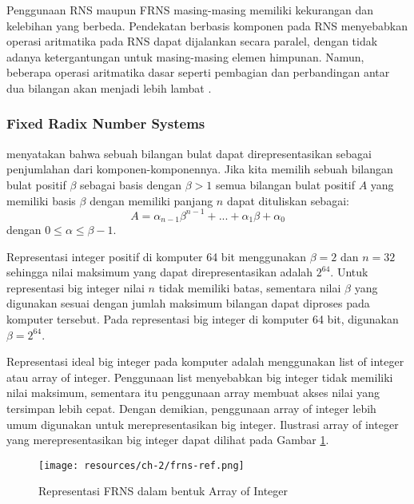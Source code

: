     Penggunaan RNS maupun FRNS masing-masing memiliki kekurangan dan kelebihan yang berbeda. Pendekatan berbasis komponen pada RNS menyebabkan operasi aritmatika pada RNS dapat dijalankan secara paralel, dengan tidak adanya ketergantungan untuk masing-masing elemen himpunan. Namun, beberapa operasi aritmatika dasar seperti pembagian dan perbandingan antar dua bilangan akan menjadi lebih lambat \citep{gpu_bignum}.

    \subsubsection{Fixed Radix Number Systems} \label{sec:frns}

    \citet{modern_comp_math} menyatakan bahwa sebuah bilangan bulat dapat direpresentasikan sebagai penjumlahan dari komponen-komponennya. Jika kita memilih sebuah bilangan bulat positif $\beta$ sebagai basis dengan $\beta > 1 $ semua bilangan bulat positif $A$ yang memiliki basis $\beta$ dengan memiliki panjang $n$ dapat dituliskan sebagai:
    \begin{equation} \label{eq:frns_rep}
      A = \alpha_{n-1}\beta^{n-1}+...+\alpha_{1}\beta+\alpha_{0}
    \end{equation}
    dengan $0 \leq \alpha \leq \beta -1$.

    Representasi integer positif di komputer 64 bit menggunakan $\beta = 2$ dan $n = 32$ sehingga nilai maksimum yang dapat direpresentasikan adalah $2^{64}$. Untuk representasi big integer nilai $n$ tidak memiliki batas, sementara nilai $\beta$ yang digunakan sesuai dengan jumlah maksimum bilangan dapat diproses pada komputer tersebut. Pada representasi big integer di komputer 64 bit, digunakan $\beta = 2^{64}$.

    Representasi ideal big integer pada komputer adalah menggunakan list of integer atau array of integer. Penggunaan list menyebabkan big integer tidak memiliki nilai maksimum, sementara itu penggunaan array membuat akses nilai yang tersimpan lebih cepat. Dengan demikian, penggunaan array of integer lebih umum digunakan untuk merepresentasikan big integer. Ilustrasi array of integer yang merepresentasikan big integer dapat dilihat pada Gambar \ref{fig:frns_ref}.

    \begin{figure}[h]
      \centering
      \texttt{[image: resources/ch-2/frns-ref.png]}
      \caption{Representasi FRNS dalam bentuk Array of Integer}
      \label{fig:frns_ref}
    \end{figure}

